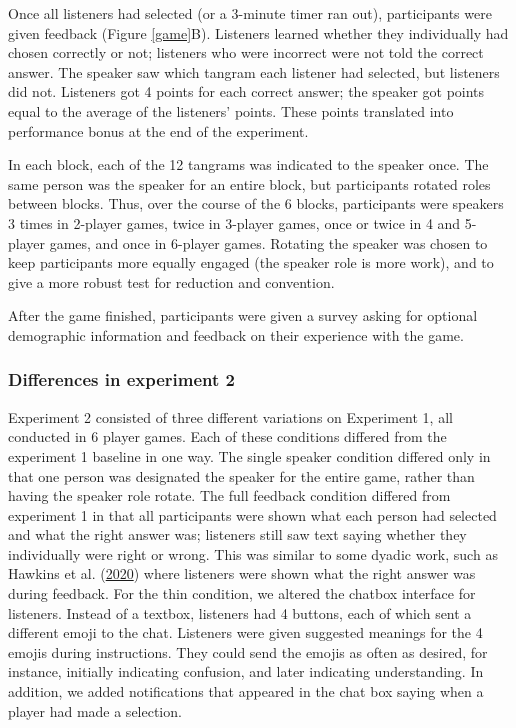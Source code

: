 \documentclass[
  english,
  a4paper,
]{article}
\begin{document}
Once all listeners had selected (or a 3-minute timer ran out), participants were given feedback (Figure \ref{game}B). Listeners learned whether they individually had chosen correctly or not; listeners who were incorrect were not told the correct answer. The speaker saw which tangram each listener had selected, but listeners did not. Listeners got 4 points for each correct answer; the speaker got points equal to the average of the listeners' points. These points translated into performance bonus at the end of the experiment.

In each block, each of the 12 tangrams was indicated to the speaker once. The same person was the speaker for an entire block, but participants rotated roles between blocks. Thus, over the course of the 6 blocks, participants were speakers 3 times in 2-player games, twice in 3-player games, once or twice in 4 and 5-player games, and once in 6-player games. Rotating the speaker was chosen to keep participants more equally engaged (the speaker role is more work), and to give a more robust test for reduction and convention.

After the game finished, participants were given a survey asking for optional demographic information and feedback on their experience with the game.

\hypertarget{differences-in-experiment-2}{%
\subsubsection{Differences in experiment 2}\label{differences-in-experiment-2}}

Experiment 2 consisted of three different variations on Experiment 1, all conducted in 6 player games. Each of these conditions differed from the experiment 1 baseline in one way. The single speaker condition differed only in that one person was designated the speaker for the entire game, rather than having the speaker role rotate. The full feedback condition differed from experiment 1 in that all participants were shown what each person had selected and what the right answer was; listeners still saw text saying whether they individually were right or wrong. This was similar to some dyadic work, such as Hawkins et al. (\protect\hyperlink{ref-hawkinsCharacterizingDynamicsLearning2020}{2020}) where listeners were shown what the right answer was during feedback. For the thin condition, we altered the chatbox interface for listeners. Instead of a textbox, listeners had 4 buttons, each of which sent a different emoji to the chat. Listeners were given suggested meanings for the 4 emojis during instructions. They could send the emojis as often as desired, for instance, initially indicating confusion, and later indicating understanding. In addition, we added notifications that appeared in the chat box saying when a player had made a selection.
\end{document}

